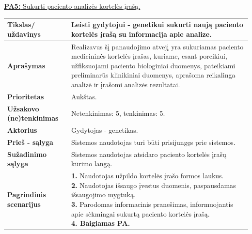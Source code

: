 \documentclass[12pt]{article}
\begin{document}
\newpage

\noindent \hypertarget{FR5}{\hyperlink{PA5}{\textbf{PA5:} Sukurti paciento
analizės kortelės įrašą.}}
\label{sec:FR5}
\begin{table}[htb!]
    \captionsetup{justification=centering}
    \begin{tabular}{|m{3cm}|m{13.7cm}|}
        \hline
        \raggedleft \textbf{\cellcolor{deepchampagne}Tikslas/ uždavinys} &
        Leisti gydytojui - genetikui sukurti naują paciento kortelės įrašą su
        informacija apie analize.\\
        \hline
        \raggedleft \textbf{\cellcolor{deepchampagne}Aprašymas} &
        Realizavus šį panaudojimo atvejį yra sukuriamas paciento medicininės
        kortelės įrašas, kuriame, esant poreikiui, užfiksuojami paciento
        biologiniai duomenys, pateikiami preliminarūs klinikiniai duomenys,
        aprašoma reikalinga analizė ir įrašomi analizės rezultatai. \\
        \hline
        \raggedleft \textbf{\cellcolor{deepchampagne}Prioritetas} & Aukštas. \\
        \hline
        \raggedleft \textbf{\cellcolor{deepchampagne}Užsakovo (ne)tenkinimas} &
        Netenkinimas: 5, tenkinimas: 5. \\
        \hline
        \raggedleft \textbf{\cellcolor{deepchampagne}Aktorius} &
        Gydytojas - genetikas. \\
        \hline
        \raggedleft \textbf{\cellcolor{deepchampagne}Prieš - sąlyga} &
        Sistemos naudotojas turi būti prisijungęs prie sistemos. \\
        \hline
        \raggedleft \textbf{\cellcolor{deepchampagne}Sužadinimo sąlyga} &
        Sistemos naudotojas atsidaro paciento kortelės įrašų kūrimo langą. \\
        \hline
        \raggedleft \textbf{\cellcolor{deepchampagne}Pagrindinis
        scenarijus} & \vskip 5pt
        \makecell[l]{\parbox[t]{13.7cm}{
            \textbf{1.} \textcolor{dartmouthgreen}{Naudotojas užpildo kortelės
            įrašo formos laukus.} \\
            \textbf{2.} \textcolor{dartmouthgreen}{Naudotojas išsaugo įvestus
            duomenis, paspausdamas išsaugojimo mygtuką.} \\
            \textbf{3.} Parodomas informacinis pranešimas, informuojantis apie
            sėkmingai sukurtą paciento kortelės įrašą. \\
            \textbf{4. Baigiamas PA.}
        }}
        \\

\end{tabular}
\end{table}
\end{document}
